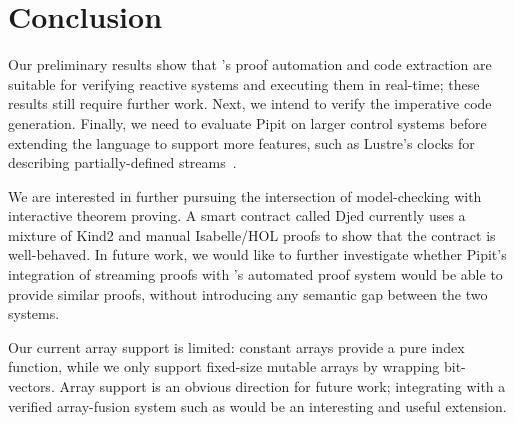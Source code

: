 
\section{Conclusion}


Our preliminary results show that \fstar{}'s proof automation and code extraction are suitable for verifying reactive systems and executing them in real-time; these results still require further work.
Next, we intend to verify the imperative code generation.
Finally, we need to evaluate Pipit on larger control systems before extending the language to support more features, such as Lustre's clocks for describing partially-defined streams~\cite{caspi1995functional}.


We are interested in further pursuing the intersection of model-checking with interactive theorem proving.
A smart contract called Djed \cite{zahnentferner2023djed} currently uses a mixture of Kind2 \cite{champion2016kind2} and manual Isabelle/HOL proofs to show that the contract is well-behaved.
In future work, we would like to further investigate whether Pipit's integration of streaming proofs with \fstar{}'s automated proof system would be able to provide similar proofs, without introducing any semantic gap between the two systems.

Our current array support is limited: constant arrays provide a pure index function, while we only support fixed-size mutable arrays by wrapping bit-vectors.
Array support is an obvious direction for future work; integrating with a verified array-fusion system such as \cite{robinson2017machine} would be an interesting and useful extension.
